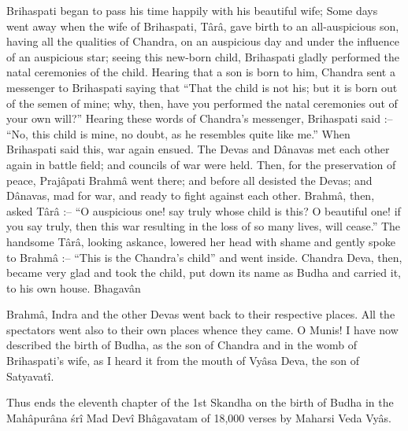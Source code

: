 Brihaspati began to pass his time happily with his beautiful wife; Some days went away when the wife of Brihaspati, T\^ar\^a, gave birth to an all-auspicious son, having all the qualities of Chandra, on an auspicious day and under the influence of an auspicious star; seeing this new-born child, Brihaspati gladly performed the natal ceremonies of the child. Hearing that a son is born to him, Chandra sent a messenger to Brihaspati saying that ``That the child is not his; but it is born out of the semen of mine; why, then, have you performed the natal ceremonies out of your own will?'' Hearing these words of Chandra's messenger, Brihaspati said :-- ``No, this child is mine, no doubt, as he resembles quite like me.'' When Brihaspati said this, war again ensued. The Devas and D\^anavas met each other again in battle field; and councils of war were held. Then, for the preservation of peace, Praj\^apati Brahm\^a went there; and before all desisted the Devas; and D\^anavas, mad for war, and ready to fight against each other. Brahm\^a, then, asked T\^ar\^a :-- ``O auspicious one! say truly whose child is this? O beautiful one! if you say truly, then this war resulting in the loss of so many lives, will cease.'' The handsome T\^ar\^a, looking askance, lowered her head with shame and gently spoke to Brahm\^a :-- ``This is the Chandra's child'' and went inside. Chandra Deva, then, became very glad and took the child, put down its name as Budha and carried it, to his own house. Bhagav\^an

Brahm\^a, Indra and the other Devas went back to their respective places. All the spectators went also to their own places whence they came. O Munis! I have now described the birth of Budha, as the son of Chandra and in the womb of Brihaspati's wife, as I heard it from the mouth of Vy\^asa Deva, the son of Satyavat\^i.

Thus ends the eleventh chapter of the 1st Skandha on the birth of Budha in the Mah\^apur\^ana \'sr\^i Mad Dev\^i Bh\^agavatam of 18,000 verses by Maharsi Veda Vy\^as.
